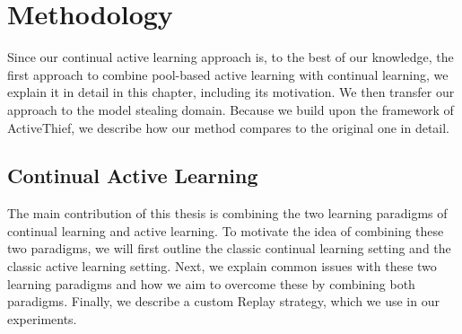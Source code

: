 
\chapter{Methodology}
\label{ch:Methodolody}

Since our continual active learning approach is, to the best of our knowledge, the first approach to combine pool-based active learning with continual
learning, we explain it in detail in this chapter, including its motivation. We then transfer our approach to the model stealing domain. Because we
build upon the framework of ActiveThief, we describe how our method compares to the original one in detail.

\section{Continual Active Learning}
\label{sec:Methodology:ContinualActiveLearning}
The main contribution of this thesis is combining the two learning paradigms of continual learning and active learning. To motivate the idea of combining
these two paradigms, we will first outline the classic continual learning setting and the classic active learning setting.
Next, we explain common issues with these two learning paradigms and how we aim to overcome these by combining both paradigms. Finally, we describe a custom
Replay strategy, which we use in our experiments.

